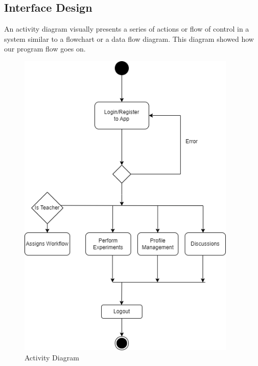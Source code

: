 \subsection{Interface Design}
An activity diagram visually presents a series of actions or flow of control in a system similar to a flowchart or a data flow diagram. This diagram showed how our program flow goes on.
\begin{figure}[H]
   \centering
    \includegraphics[height = 15cm]{Diagrams/Activity.drawio.png}
    \caption{Activity Diagram}
\end{figure}
\newpage
